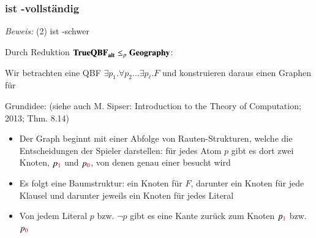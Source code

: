 \documentclass[aspectratio=1610,onlymath]{beamer}
\begin{document}
\begin{frame}[t]\frametitle{ ist \PSpace-vollständig }

\vspace{-1ex}
\pause

\emph{Beweis:} (2)  ist \PSpace-schwer\pause
\smallskip

Durch Reduktion $\textbf{\textcolor{black}{TrueQBF}}_{\textbf{\textcolor{black}{alt}}}\leq_p \textbf{\textcolor{black}{Geography}}$:

Wir betrachten eine QBF $\exists p_1.\forall p_2\ldots \exists p_\ell. F$
und konstruieren daraus einen Graphen für  \bigskip

\alert{Grundidee:} {\tiny (siehe auch M. Sipser: Introduction to the Theory of Computation; 2013; Thm. 8.14)}
\begin{itemize}
\item Der Graph beginnt mit einer Abfolge von Rauten-Strukturen, welche die 
Entscheidungen der Spieler darstellen: für jedes Atom $p$ gibt es dort zwei Knoten, $p_{\textcolor{purple}{1}}$ und $p_{\textcolor{purple}{0}}$, von denen genau einer besucht wird
\item Es folgt eine Baumstruktur: ein Knoten für $F$, darunter ein Knoten für jede Klausel und darunter jeweils ein Knoten für jedes Literal
\item Von jedem Literal $p$ bzw. $\neg p$ gibt es eine Kante zurück zum Knoten $p_{\textcolor{purple}{1}}$ bzw. $p_{\textcolor{purple}{0}}$
\end{itemize}


\end{frame}
\end{document}
